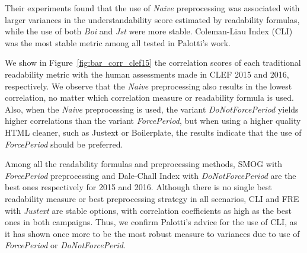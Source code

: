 Their experiments found that the use of \textit{Naive} preprocessing was associated with larger variances in the understandability score estimated by readability formulas, while the use of both \textit{Boi} and \textit{Jst} were more stable. Coleman-Liau Index (CLI) was the most stable metric among all tested in Palotti's work\cite{palotti15}.


We show in Figure~\ref{fig:bar_corr_clef15} %
the correlation scores of each traditional readability metric with the human assessments made in CLEF 2015 and 2016, respectively. We observe that the \textit{Naive} preprocessing also results in the lowest
correlation, no matter which correlation measure or readability formula is used. Also, when the \textit{Naive} preprocessing is used, the variant \textit{DoNotForcePeriod} yields higher correlations than the variant \textit{ForcePeriod}, but when using a higher quality HTML cleaner, such as Justext or Boilerplate, the results indicate that the use of \textit{ForcePeriod} should be preferred.

Among all the readability formulas and preprocessing methods, SMOG with \textit{ForcePeriod} preprocessing and Dale-Chall Index with \textit{DoNotForcePeriod} are the best ones respectively for 2015 and 2016. Although there is no single best readability measure or best preprocessing strategy in all scenarios, CLI and FRE with \textit{Justext} are stable options, with correlation coefficients as high as the best ones in both campaigns. Thus, we confirm Palotti's advice for the use of CLI, as it
has shown once more to be the most robust measure to variances due to use of \textit{ForcePeriod} or \textit{DoNotForcePerid}.


